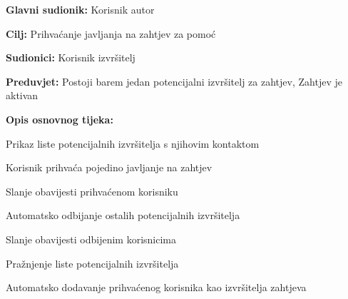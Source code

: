 				
					
					\noindent {}
					\begin{packed_item}
						
						\item \textbf{Glavni sudionik: }Korisnik autor
						\item  \textbf{Cilj:} Prihvaćanje javljanja na zahtjev za pomoć 
						\item  \textbf{Sudionici:} Korisnik izvršitelj
						\item  \textbf{Preduvjet:} Postoji barem jedan potencijalni izvršitelj za zahtjev, Zahtjev je aktivan
						\item  \textbf{Opis osnovnog tijeka:}
						
						\item[] \begin{packed_enum}
							
							\item Prikaz liste potencijalnih izvršitelja s njihovim kontaktom
							\item Korisnik prihvaća pojedino javljanje na zahtjev
							\item Slanje obavijesti prihvaćenom korisniku
							\item Automatsko odbijanje ostalih potencijalnih izvršitelja
							\item Slanje obavijesti odbijenim korisnicima
							\item Pražnjenje liste potencijalnih izvršitelja
							\item Automatsko dodavanje prihvaćenog korisnika kao izvršitelja zahtjeva
						\end{packed_enum}
						
					\end{packed_item}
				
